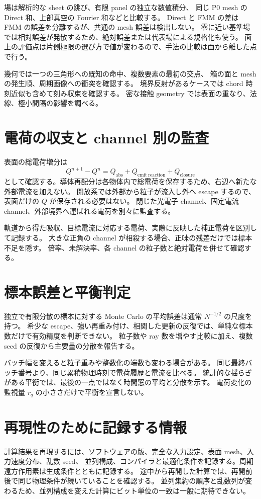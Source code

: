 場は解析的な sheet の跳び、有限 panel の独立な数値積分、
同じ P0 mesh の Direct 和、上部真空の Fourier 和などと比較する。
Direct と FMM の差は FMM の誤差を分離するが、共通の mesh 誤差は検出しない。
零に近い基準場では相対誤差が発散するため、絶対誤差または代表場による規格化も使う。
面上の評価点は片側極限の選び方で値が変わるので、手法の比較は面から離した点で行う。

幾何では一つの三角形への既知の命中、複数要素の最初の交点、
箱の面と mesh の発生順、周期画像への衝突を確認する。
境界反射があるケースでは chord 時刻近似も含めて刻み収束を確認する。
密な接触 geometry では表面の重なり、法線、極小間隔の影響を調べる。

\section{電荷の収支と channel 別の監査}
表面の総電荷増分は
\begin{equation}
 Q^{n+1}-Q^n=
  Q_{\mathrm{abs}}+Q_{\mathrm{emit\ reaction}}+Q_{\mathrm{closure}}
 \label{eq:ledger}
\end{equation}
として確認する。導体再配分は各物体内で総電荷を保存するため、右辺へ新たな外部電流を加えない。
開放系では外部から粒子が流入し外へ escape するので、表面だけの $Q$ が保存される必要はない。
閉じた光電子 channel、固定電流 channel、外部境界へ運ばれる電荷を別々に監査する。

軌道から得た吸収、目標電流に対応する電荷、実際に反映した補正電荷を区別して記録する。
大きな正負の channel が相殺する場合、正味の残差だけでは標本不足を隠す。
倍率、未解決率、各 channel の粒子数と絶対電荷を併せて確認する。

\section{標本誤差と平衡判定}
独立で有限分散の標本に対する Monte Carlo の平均誤差は通常 $N^{-1/2}$ の尺度を持つ。
希少な escape、強い再重み付け、相関した更新の反復では、単純な標本数だけで有効精度を判断できない。
粒子数や ray 数を増やす比較に加え、複数 seed の反復から主要量の分散を報告する。

バッチ幅を変えると粒子重みや整数化の端数も変わる場合がある。
同じ最終バッチ番号より、同じ累積物理時刻で電荷履歴と電流を比べる。
統計的な揺らぎがある平衡では、最後の一点ではなく時間窓の平均と分散を示す。
電荷変化の監視量 $r_q$ の小ささだけで平衡を宣言しない。

\section{再現性のために記録する情報}
計算結果を再現するには、ソフトウェアの版、完全な入力設定、表面 mesh、入力速度分布、乱数 seed、
並列構成、コンパイラと最適化条件を記録する。周期遠方作用素は生成条件とともに記録する。
途中から再開した計算では、再開前後で同じ物理条件が続いていることを確認する。
並列集約の順序と乱数列が変わるため、並列構成を変えた計算にビット単位の一致は一般に期待できない。
